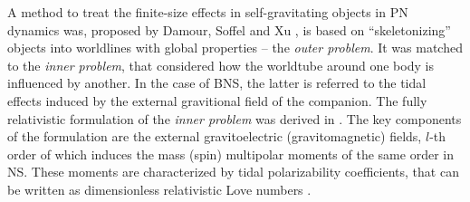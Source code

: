 A method to treat the finite-size effects in self-gravitating objects in \ac{PN} 
dynamics was, proposed by Damour, Soffel and Xu \cite{Damour:1983a}, is based on ``skeletonizing'' 
objects into worldlines with global properties -- the \textit{outer problem}.
%
It was matched to the \textit{inner problem}, that considered how the worldtube 
around one body is influenced by another. In the case of \ac{BNS}, the latter is 
referred to the tidal effects induced by the external gravitional field of the companion. 
The fully relativistic formulation of the \textit{inner problem} was derived in 
\cite{Hinderer:2007mb,Damour:2009vw,Binnington:2009bb}. 
%
%
The key components of the formulation are the external gravitoelectric 
(gravitomagnetic) fields, $l$-th order of which induces the mass (spin) multipolar moments 
of the same order in \ac{NS}. These moments are characterized by %
tidal polarizability coefficients, that can be written as dimensionless relativistic 
Love numbers \cite{Damour:2009vw,Binnington:2009bb}.
%
